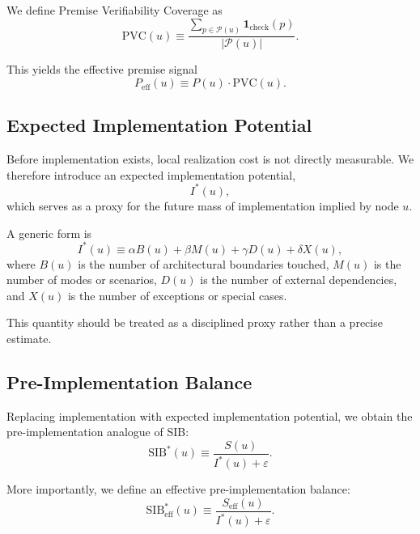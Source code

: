 \documentclass[twocolumn]{aastex701}
\begin{document}
We define Premise Verifiability Coverage as
\begin{equation}
\mathrm{PVC}(u) \equiv
\frac{\sum_{p \in \mathcal{P}(u)} \mathbf{1}_{\mathrm{check}}(p)}
{|\mathcal{P}(u)|}.
\end{equation}

This yields the effective premise signal
\begin{equation}
P_{\mathrm{eff}}(u) \equiv P(u)\cdot \mathrm{PVC}(u).
\end{equation}

\subsection{Expected Implementation Potential}

Before implementation exists, local realization cost is not directly measurable.
We therefore introduce an expected implementation potential,
\begin{equation}
I^\ast(u),
\end{equation}
which serves as a proxy for the future mass of implementation implied by node $u$.

A generic form is
\begin{equation}
I^\ast(u) \equiv
\alpha B(u) + \beta M(u) + \gamma D(u) + \delta X(u),
\end{equation}
where $B(u)$ is the number of architectural boundaries touched,
$M(u)$ is the number of modes or scenarios,
$D(u)$ is the number of external dependencies,
and $X(u)$ is the number of exceptions or special cases.

This quantity should be treated as a disciplined proxy rather than a precise estimate.

\subsection{Pre-Implementation Balance}

Replacing implementation with expected implementation potential,
we obtain the pre-implementation analogue of SIB:
\begin{equation}
\mathrm{SIB}^\ast(u) \equiv \frac{S(u)}{I^\ast(u)+\varepsilon}.
\end{equation}

More importantly, we define an effective pre-implementation balance:
\begin{equation}
\mathrm{SIB}_{\mathrm{eff}}^\ast(u) \equiv
\frac{S_{\mathrm{eff}}(u)}{I^\ast(u)+\varepsilon}.
\end{equation}
\end{document}
